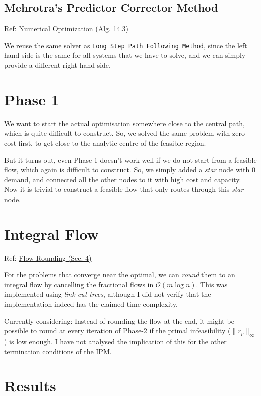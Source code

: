 \documentclass[10pt,a4paper]{article}
\newcommand{\Oo}{\mathcal{O}}
\begin{document}
\subsection{Mehrotra's Predictor Corrector Method}

Ref: \href{https://link.springer.com/book/10.1007/978-0-387-40065-5}{Numerical Optimization (Alg. 14.3)}

We reuse the same solver as \texttt{Long Step Path Following Method}, since the left hand side is the same for all systems that we have to solve, and we can simply provide a different right hand side.

\section{Phase 1}

We want to start the actual optimisation somewhere close to the central path, which is quite difficult to construct. So, we solved the same problem with zero cost first, to get close to the analytic centre of the feasible region.

But it turns out, even Phase-1 doesn't work well if we do not start from a feasible flow, which again is difficult to construct. So, we simply added a \emph{star} node with 0 demand, and connected all the other nodes to it with high cost and capacity. Now it is trivial to construct a feasible flow that only routes through this \emph{star} node.

\section{Integral Flow}

Ref: \href{https://arxiv.org/pdf/1507.08139.pdf}{Flow Rounding (Sec. 4)}

For the problems that converge near the optimal, we can \emph{round} them to an integral flow by cancelling the fractional flows in $\Oo(m\log n)$. This was implemented using \emph{link-cut trees}, although I did not verify that the implementation indeed has the claimed time-complexity.

Currently considering: Instead of rounding the flow at the end, it might be possible to round at every iteration of Phase-2 if the primal infeasibility ($\|r_p\|_\infty$) is low enough. I have not analysed the implication of this for the other termination conditions of the IPM.

\section{Results}
\end{document}
